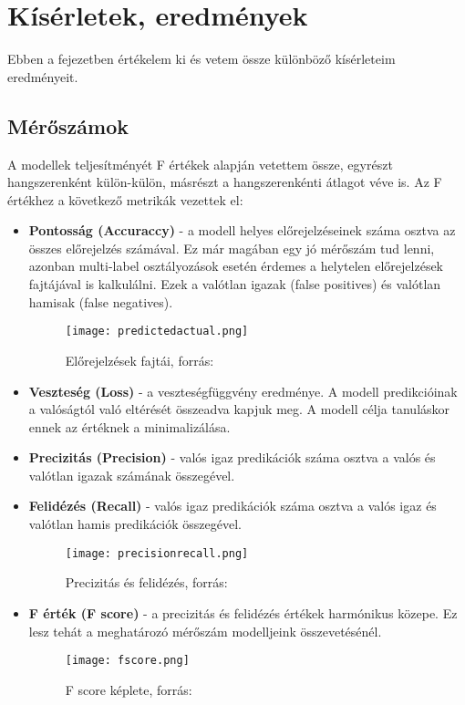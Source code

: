 \chapter{Kísérletek, eredmények} 
\label{ch:results}

Ebben a fejezetben értékelem ki és vetem össze különböző kísérleteim eredményeit.

\section{Mérőszámok}

A modellek teljesítményét F értékek alapján vetettem össze, egyrészt hangszerenként külön-külön, másrészt a hangszerenkénti átlagot véve is. Az F értékhez a következő metrikák vezettek el:

\begin{itemize}
\item \textbf{Pontosság (Accuraccy)} - a modell helyes előrejelzéseinek száma osztva az összes előrejelzés számával. Ez már magában egy jó mérőszám tud lenni, azonban multi-label osztályozások esetén érdemes a helytelen előrejelzések fajtájával is kalkulálni. Ezek a valótlan igazak (false positives) és valótlan hamisak (false negatives).
\begin{figure}[H]
  \centering
  \texttt{[image: predictedactual.png]}
  \caption{Előrejelzések fajtái, forrás: \cite{fscore}}
\end{figure}

\item \textbf{Veszteség (Loss)} - a veszteségfüggvény eredménye. A modell predikcióinak a valóságtól való eltérését összeadva kapjuk meg. A modell célja tanuláskor ennek az értéknek a minimalizálása.
\item \textbf{Precizitás (Precision)} - valós igaz predikációk száma osztva a valós és valótlan igazak számának összegével.
\item \textbf{Felidézés (Recall)} - valós igaz predikációk száma osztva a valós igaz és valótlan hamis predikációk összegével.
\begin{figure}[H]
  \centering
  \texttt{[image: precisionrecall.png]}
  \caption{Precizitás és felidézés, forrás: \cite{fscore}}
\end{figure}
\item \textbf{F érték (F score)} - a precizitás és felidézés értékek harmónikus közepe. Ez lesz tehát a meghatározó mérőszám modelljeink összevetésénél. \cite{fscore}

\begin{figure}[H]
  \centering
  \texttt{[image: fscore.png]}
  \caption{F score képlete, forrás: \cite{fscore}}
\end{figure}
\end{itemize}



